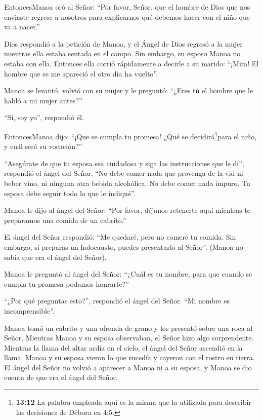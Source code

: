  EntoncesManoa oró al Señor: ``Por favor, Señor, que el
hombre de Dios que nos enviaste regrese a nosotros para explicarnos qué
debemos hacer con el niño que va a nacer.''

 Dios respondió a la petición de Manoa, y el Ángel de Dios
regresó a la mujer mientras ella estaba sentada en el campo. Sin
embargo, su esposo Manoa no estaba con ella.  Entonces ella
corrió rápidamente a decirle a su marido: ``¡Mira! El hombre que se me
apareció el otro día ha vuelto''.

 Manoa se levantó, volvió con su mujer y le preguntó:
``¿Eres tú el hombre que le habló a mi mujer antes?''

``Sí, soy yo'', respondió él.

 EntoncesManoa dijo: ``¡Que se cumpla tu promesa! ¿Qué se
decidirá\footnote{\textbf{13:12} La palabra empleada aquí es la misma
  que la utilizada para describir las decisiones de Débora en 4:5.}para
el niño, y cuál será su vocación?''

 ``Asegúrate de que tu esposa sea cuidadosa y siga las
instrucciones que le di'', respondió el ángel del Señor. 
``No debe comer nada que provenga de la vid ni beber vino, ni ninguna
otra bebida alcohólica. No debe comer nada impuro. Tu esposa debe seguir
todo lo que le indiqué''.

 Manoa le dijo al ángel del Señor: ``Por favor, déjanos
retenerte aquí mientras te preparamos una comida de un cabrito.''

 El ángel del Señor respondió: ``Me quedaré, pero no comeré
tu comida. Sin embargo, si preparas un holocausto, puedes presentarlo al
Señor''. (Manoa no sabía que era el ángel del Señor).

 Manoa le preguntó al ángel del Señor: ``¿Cuál es tu
nombre, para que cuando se cumpla tu promesa podamos honrarte?''

 ``¿Por qué preguntas esto?'', respondió el ángel del
Señor. ``Mi nombre es incomprensible''.

 Manoa tomó un cabrito y una ofrenda de grano y los
presentó sobre una roca al Señor. Mientras Manoa y su esposa observaban,
el Señor hizo algo sorprendente.  Mientras la llama del
altar ardía en el cielo, el ángel del Señor ascendió en la llama. Manoa
y su esposa vieron lo que sucedía y cayeron con el rostro en tierra.
 El ángel del Señor no volvió a aparecer a Manoa ni a su
esposa, y Manoa se dio cuenta de que era el ángel del Señor.

